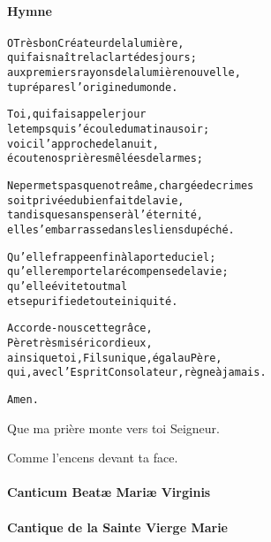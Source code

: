 \documentclass[twoside]{article}
\begin{document}
\begin{paracol}[1]{2}

\switchcolumn

\paragraph{Hymne}
\begin{alltt}\normalfont




             O Très bon Créateur de la lumière, 
             qui fais naître la clarté des jours ; 
             aux premiers rayons de la lumière nouvelle, 
             tu prépares l'origine du monde.

             Toi, qui fais appeler jour 
             le temps qui s'écoule du matin au soir ; 
             voici l'approche de la nuit, 
             écoute nos prières mêlées de larmes ;
\newpage
            
            
             Ne permets pas que notre âme, chargée de crimes 
             soit privée du bienfait de la vie, 
             tandis que sans penser à l'éternité, 
             elle s'embarrasse dans les liens du péché.
             
             Qu'elle frappe enfin à la porte du ciel ; 
             qu'elle remporte la récompense de la vie ; 
             qu'elle évite tout mal 
             et se purifie de toute iniquité.
             
             Accorde-nous cette grâce, 
             Père très miséricordieux, 
             ainsi que toi, Fils unique, égal au Père, 
             qui, avec l'Esprit Consolateur, règne à jamais. 

             Amen.
\end{alltt}

\switchcolumn*
{}
\switchcolumn

\vv Que ma prière monte vers toi Seigneur.

\rr Comme l’encens devant ta face.
\newpage
\switchcolumn*

\paragraph{Canticum Beatæ Mariæ Virginis}



\switchcolumn

\paragraph{Cantique de la Sainte Vierge Marie}


\end{paracol}
\end{document}
